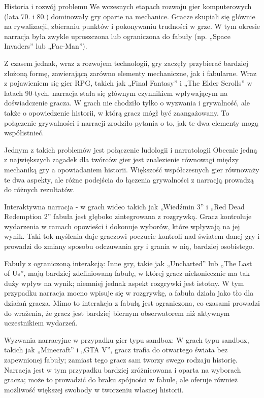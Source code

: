 \begin{frame}{Historia i rozwój problemu}
We wczesnych etapach rozwoju gier komputerowych (lata 70. i 80.) dominowały gry oparte na mechanice. Gracze skupiali się głównie na rywalizacji, zbieraniu punktów i pokonywaniu trudności w grze. W tym okresie narracja była zwykle uproszczona lub ograniczona do fabuły (np. „Space Invaders” lub „Pac-Man”).

Z czasem jednak, wraz z rozwojem technologii, gry zaczęły przybierać bardziej złożoną formę, zawierającą zarówno elementy mechaniczne, jak i fabularne. Wraz z pojawieniem się gier RPG, takich jak „Final Fantasy” i „The Elder Scrolls” w latach 90-tych, narracja stała się głównym czynnikiem wpływającym na doświadczenie gracza. W grach nie chodziło tylko o wyzwania i grywalność, ale także o opowiedzenie historii, w którą gracz mógł być zaangażowany. To połączenie grywalności i narracji zrodziło pytania o to, jak te dwa elementy mogą współistnieć.

Jednym z takich problemów jest połączenie ludologii i narratologii
Obecnie jedną z największych zagadek dla twórców gier jest znalezienie równowagi między mechaniką gry a opowiadaniem historii. Większość współczesnych gier równoważy te dwa aspekty, ale różne podejścia do łączenia grywalności z narracją prowadzą do różnych rezultatów.

Interaktywna narracja - w grach wideo takich jak „Wiedźmin 3” i „Red Dead Redemption 2” fabuła jest głęboko zintegrowana z rozgrywką. Gracz kontroluje wydarzenia w ramach opowieści i dokonuje wyborów, które wpływają na jej wynik. Taki tok myślenia daje graczowi poczucie kontroli nad światem danej gry i prowadzi do zmiany sposobu odczuwania gry i grania w nią, bardziej osobistego.

Fabuły z ograniczoną interakcją: Inne gry, takie jak „Uncharted” lub „The Last of Us”, mają bardziej zdefiniowaną fabułę, w której gracz niekoniecznie ma tak duży wpływ na wynik; niemniej jednak aspekt rozgrywki jest istotny. W tym przypadku narracja mocno wpisuje się w rozgrywkę, a fabuła działa jako tło dla działań gracza. Mimo to interakcja z fabułą jest ograniczona, co czasami prowadzi do wrażenia, że gracz jest bardziej biernym obserwatorem niż aktywnym uczestnikiem wydarzeń.

Wyzwania narracyjne w przypadku gier typu sandbox: W grach typu sandbox, takich jak „Minecraft” i „GTA V”, gracz trafia do otwartego świata bez zapewnionej fabuły; zamiast tego gracz sam tworzy swego rodzaju historię. Narracja jest w tym przypadku bardziej zróżnicowana i oparta na wyborach gracza; może to prowadzić do braku spójności w fabule, ale oferuje również możliwość większej swobody w tworzeniu własnej historii.
\end{frame}
